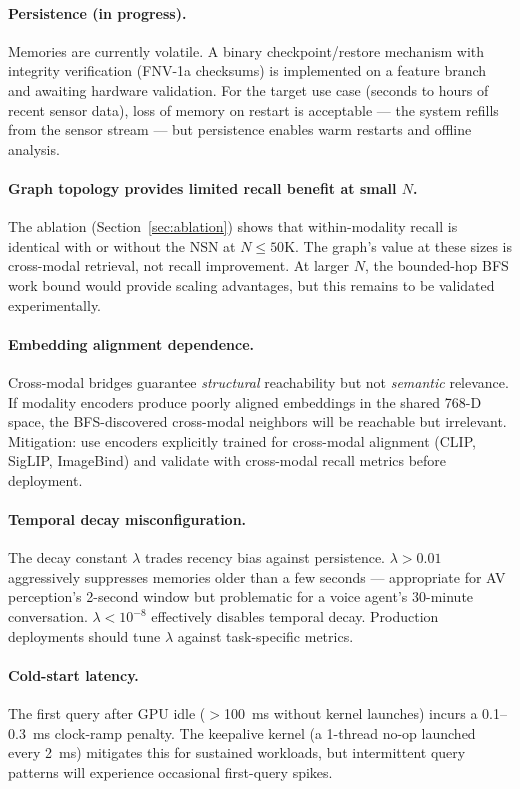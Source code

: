 \documentclass[11pt]{article}
\begin{document}
\paragraph{Persistence (in progress).}
Memories are currently volatile. A binary checkpoint/restore mechanism
with integrity verification (FNV-1a checksums) is implemented on a
feature branch and awaiting hardware validation. For the target use
case (seconds to hours of recent sensor data), loss of memory on
restart is acceptable --- the system refills from the sensor stream ---
but persistence enables warm restarts and offline analysis.

\paragraph{Graph topology provides limited recall benefit at small $N$.}
The ablation (Section~\ref{sec:ablation}) shows that within-modality
recall is identical with or without the NSN at $N \leq 50$K. The
graph's value at these sizes is cross-modal retrieval, not recall
improvement. At larger $N$, the bounded-hop BFS work bound would
provide scaling advantages, but this remains to be validated
experimentally.

\paragraph{Embedding alignment dependence.}
Cross-modal bridges guarantee \emph{structural} reachability but not
\emph{semantic} relevance. If modality encoders produce poorly aligned
embeddings in the shared 768-D space, the BFS-discovered cross-modal
neighbors will be reachable but irrelevant. Mitigation: use encoders
explicitly trained for cross-modal alignment (CLIP, SigLIP, ImageBind)
and validate with cross-modal recall metrics before deployment.

\paragraph{Temporal decay misconfiguration.}
The decay constant $\lambda$ trades recency bias against persistence.
$\lambda > 0.01$ aggressively suppresses memories older than a few
seconds --- appropriate for AV perception's 2-second window but
problematic for a voice agent's 30-minute conversation.
$\lambda < 10^{-8}$ effectively disables temporal decay. Production
deployments should tune $\lambda$ against task-specific metrics.

\paragraph{Cold-start latency.}
The first query after GPU idle ($>$100~ms without kernel launches)
incurs a 0.1--0.3~ms clock-ramp penalty. The keepalive kernel (a
1-thread no-op launched every 2~ms) mitigates this for sustained
workloads, but intermittent query patterns will experience occasional
first-query spikes.
\end{document}
